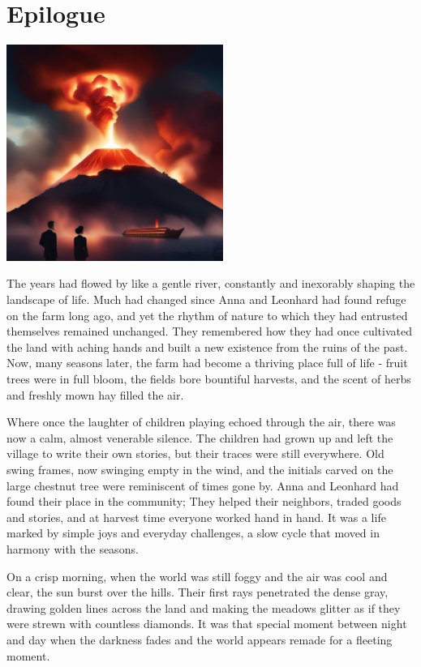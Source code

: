 \documentclass[
]{article}
\begin{document}
\section{Epilogue}\label{epilogue}

\includegraphics[width=2.78439in,height=2.7785in]{media/image6.png}

The years had flowed by like a gentle river, constantly and inexorably
shaping the landscape of life. Much had changed since Anna and Leonhard
had found refuge on the farm long ago, and yet the rhythm of nature to
which they had entrusted themselves remained unchanged. They remembered
how they had once cultivated the land with aching hands and built a new
existence from the ruins of the past. Now, many seasons later, the farm
had become a thriving place full of life - fruit trees were in full
bloom, the fields bore bountiful harvests, and the scent of herbs and
freshly mown hay filled the air.

Where once the laughter of children playing echoed through the air,
there was now a calm, almost venerable silence. The children had grown
up and left the village to write their own stories, but their traces
were still everywhere. Old swing frames, now swinging empty in the wind,
and the initials carved on the large chestnut tree were reminiscent of
times gone by. Anna and Leonhard had found their place in the community;
They helped their neighbors, traded goods and stories, and at harvest
time everyone worked hand in hand. It was a life marked by simple joys
and everyday challenges, a slow cycle that moved in harmony with the
seasons.

On a crisp morning, when the world was still foggy and the air was cool
and clear, the sun burst over the hills. Their first rays penetrated the
dense gray, drawing golden lines across the land and making the meadows
glitter as if they were strewn with countless diamonds. It was that
special moment between night and day when the darkness fades and the
world appears remade for a fleeting moment.
\end{document}
